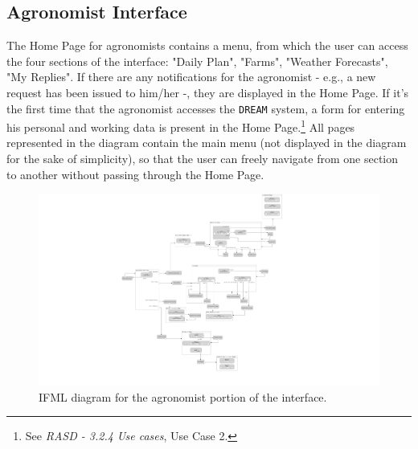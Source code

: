 \documentclass{article}
\begin{document}
\subsection{Agronomist Interface}
The Home Page for agronomists contains a menu, from which the user can access the four sections of the interface: "Daily Plan", "Farms", "Weather Forecasts", "My Replies". \newline
If there are any notifications for the agronomist - e.g., a new request has been issued to him/her -, they are displayed in the Home Page.\newline
If it's the first time that the agronomist accesses the \verb|DREAM| system, a form for entering his personal and working data is present in the Home Page.\footnote{See \textit{RASD - 3.2.4 Use cases}, Use Case 2.}\newline
All pages represented in the diagram contain the main menu (not displayed in the diagram for the sake of simplicity), so that the user can freely navigate from one section to another without passing through the Home Page. \vspace{7cm}
\begin{center}
    \begin{figure}
    \includegraphics[scale=0.07]{diagrams/ui diagrams/agronomist/agronomist.png}
    \caption{IFML diagram for the agronomist portion of the interface.}
\end{figure}
\end{center}
\end{document}
